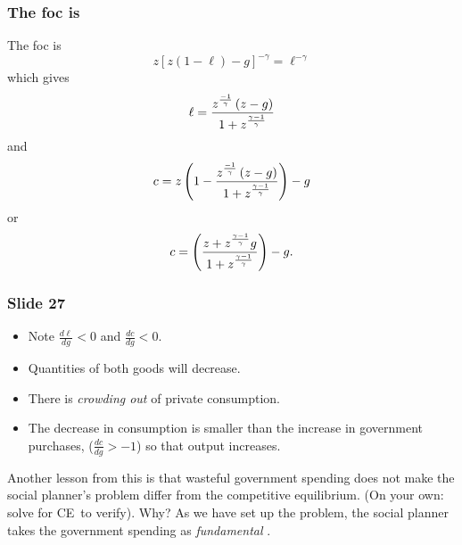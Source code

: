 \documentclass[aspectratio=169]{ltx-talk}
\begin{document}
\begin{frame}
\frametitle{The foc is}
The foc is%
\begin{equation*}
z\left[ z(1-\ell )-g\right] ^{-\gamma }=\ell ^{-\gamma }
\end{equation*}%
which gives 
\begin{equation*}
\ell =\frac{z^{\frac{-1}{\gamma }}\left( z-g\right) }{1+z^{\frac{\gamma -1}{%
\gamma }}}
\end{equation*}%
and%
\begin{equation*}
c=z\left( 1-\frac{z^{\frac{-1}{\gamma }}\left( z-g\right) }{1+z^{\frac{%
\gamma -1}{\gamma }}}\right) -g
\end{equation*}%
or%
\begin{equation*}
c=\left( \frac{z+z^{\frac{\gamma -1}{\gamma }}g}{1+z^{\frac{\gamma -1}{%
\gamma }}}\right) -g.
\end{equation*}%
\end{frame}

\begin{frame}
\frametitle{Slide 27}
\begin{itemize}
\item Note $\frac{d\ell }{dg}<0$ and $\frac{dc}{dg}<0.$

\item Quantities of both goods will decrease.

\item There is \textit{crowding out} of private consumption.

\item The decrease in consumption is smaller than the increase in government
purchases, ($\frac{dc}{dg}>-1$) so that output increases.
\end{itemize}

Another lesson from this is that wasteful government spending does not make
the social planner's problem differ from the competitive equilibrium. (On
your own: solve for CE\ to verify). Why? As we have set up the problem, the
social planner takes the government spending as \textit{fundamental}%
.
\end{frame}
\end{document}
